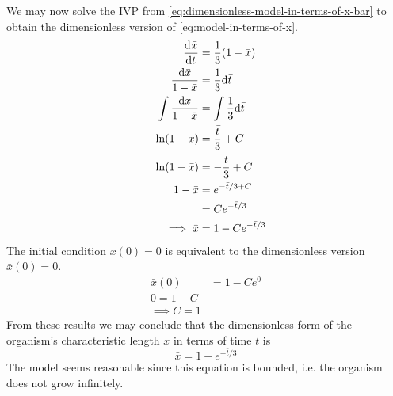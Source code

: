 \documentclass[12pt]{article}
\begin{document}
We may now solve the IVP from \cref{eq:dimensionless-model-in-terms-of-x-bar} to
obtain the dimensionless version of \cref{eq:model-in-terms-of-x}.
\begin{equation*}
  \begin{aligned}
    \frac{\mathrm{d}^{} {\bar{x}}}{\mathrm{d}{\bar{t}}^{}} &= \frac{1}{3}(1-\bar{x}) \\
    \frac{\mathrm{d}{\bar{x}}}{1-\bar{x}} &= \frac{1}{3} \mathrm{d}{\bar{t}} \\
    \int \frac{\mathrm{d}{\bar{x}}}{1-\bar{x}} &= \int \frac{1}{3} \mathrm{d}{\bar{t}} \\
    -\ln (1-\bar{x}) &= \frac{\bar{t}}{3} + C \\
    \ln (1-\bar{x}) &= -\frac{\bar{t}}{3} + C \\
    1-\bar{x} &= e^{-\bar{t}/3+C} \\
    &= Ce^{-\bar{t}/3} \\
    \implies \bar{x} &= 1-Ce^{-\bar{t}/3}
  \end{aligned}
\end{equation*}
The initial condition $x(0)=0$ is equivalent to the dimensionless version
$\bar{x}(0)=0$.
\begin{equation*}
  \begin{aligned}
    \bar{x}(0) &= 1-Ce^{0} \\
    0 = 1-C \\
    \implies C = 1
  \end{aligned}
\end{equation*}
From these results we may conclude that the dimensionless form of the organism's
characteristic length $x$ in terms of time $t$ is
\begin{equation*} \boxed{
    \bar{x} = 1-e^{-\bar{t}/3}
  }
\end{equation*}
The model seems reasonable since this equation is bounded, i.e. the organism
does not grow infinitely.


\end{document}
